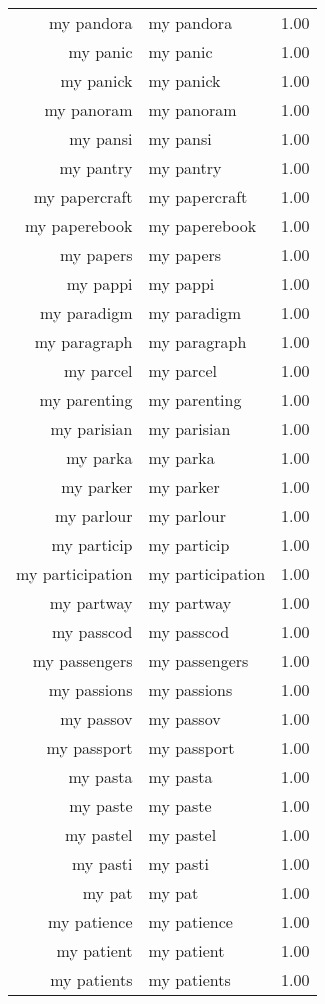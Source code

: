 \begin{table}[ht]
\begin{tabular}{rlr}
  my pandora & my pandora & 1.00 \\ 
  my panic & my panic & 1.00 \\ 
  my panick & my panick & 1.00 \\ 
  my panoram & my panoram & 1.00 \\ 
  my pansi & my pansi & 1.00 \\ 
  my pantry & my pantry & 1.00 \\ 
  my papercraft & my papercraft & 1.00 \\ 
  my paperebook & my paperebook & 1.00 \\ 
  my papers & my papers & 1.00 \\ 
  my pappi & my pappi & 1.00 \\ 
  my paradigm & my paradigm & 1.00 \\ 
  my paragraph & my paragraph & 1.00 \\ 
  my parcel & my parcel & 1.00 \\ 
  my parenting & my parenting & 1.00 \\ 
  my parisian & my parisian & 1.00 \\ 
  my parka & my parka & 1.00 \\ 
  my parker & my parker & 1.00 \\ 
  my parlour & my parlour & 1.00 \\ 
  my particip & my particip & 1.00 \\ 
  my participation & my participation & 1.00 \\ 
  my partway & my partway & 1.00 \\ 
  my passcod & my passcod & 1.00 \\ 
  my passengers & my passengers & 1.00 \\ 
  my passions & my passions & 1.00 \\ 
  my passov & my passov & 1.00 \\ 
  my passport & my passport & 1.00 \\ 
  my pasta & my pasta & 1.00 \\ 
  my paste & my paste & 1.00 \\ 
  my pastel & my pastel & 1.00 \\ 
  my pasti & my pasti & 1.00 \\ 
  my pat & my pat & 1.00 \\ 
  my patience & my patience & 1.00 \\ 
  my patient & my patient & 1.00 \\ 
  my patients & my patients & 1.00 \\ 

\end{tabular}
\end{table}
